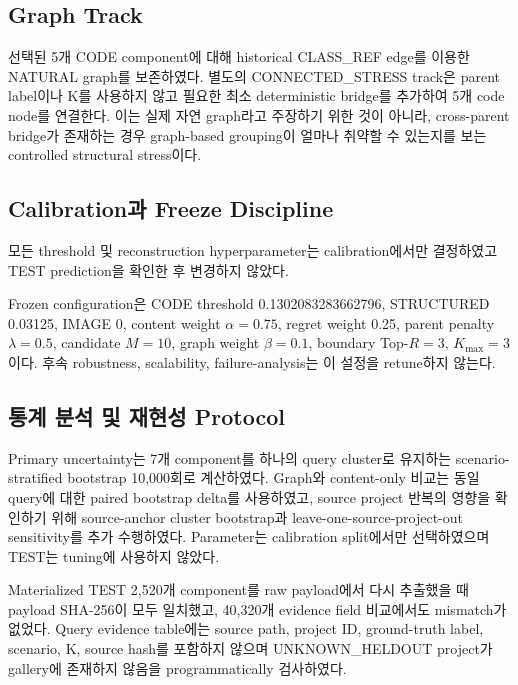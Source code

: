 \documentclass[runningheads]{llncs}
\begin{document}
\subsection{Graph Track}

선택된 5개 CODE component에 대해 historical CLASS\_REF edge를 이용한 NATURAL graph를 보존하였다. 별도의 CONNECTED\_STRESS track은 parent label이나 K를 사용하지 않고 필요한 최소 deterministic bridge를 추가하여 5개 code node를 연결한다. 이는 실제 자연 graph라고 주장하기 위한 것이 아니라, cross-parent bridge가 존재하는 경우 graph-based grouping이 얼마나 취약할 수 있는지를 보는 controlled structural stress이다.

\subsection{Calibration과 Freeze Discipline}

모든 threshold 및 reconstruction hyperparameter는 calibration에서만 결정하였고 TEST prediction을 확인한 후 변경하지 않았다.

Frozen configuration은 CODE threshold 0.1302083283662796, STRUCTURED 0.03125, IMAGE 0, content weight $\alpha=0.75$, regret weight 0.25, parent penalty $\lambda=0.5$, candidate $M=10$, graph weight $\beta=0.1$, boundary Top-$R=3$, $K_{\max}=3$이다. 후속 robustness, scalability, failure-analysis는 이 설정을 retune하지 않는다.



\subsection{통계 분석 및 재현성 Protocol}

Primary uncertainty는 7개 component를 하나의 query cluster로 유지하는 scenario-stratified bootstrap 10,000회로 계산하였다. Graph와 content-only 비교는 동일 query에 대한 paired bootstrap delta를 사용하였고, source project 반복의 영향을 확인하기 위해 source-anchor cluster bootstrap과 leave-one-source-project-out sensitivity를 추가 수행하였다. Parameter는 calibration split에서만 선택하였으며 TEST는 tuning에 사용하지 않았다.

Materialized TEST 2,520개 component를 raw payload에서 다시 추출했을 때 payload SHA-256이 모두 일치했고, 40,320개 evidence field 비교에서도 mismatch가 없었다. Query evidence table에는 source path, project ID, ground-truth label, scenario, K, source hash를 포함하지 않으며 UNKNOWN\_HELDOUT project가 gallery에 존재하지 않음을 programmatically 검사하였다.
\end{document}
